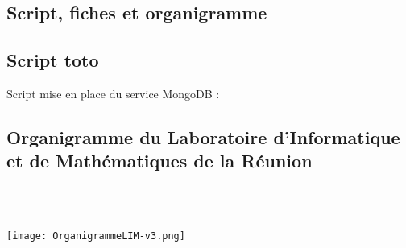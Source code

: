\begin{appendices}
\section{Script, fiches et organigramme}
\subsection{Script toto}
\label{appendix:toto}

\begin{bclogo}[logo=\bcoutil,  couleur = gray!40, arrondi=0.5,marge=10, noborder=true, sousTitre=enable\_mongo.sh]{Script mise en place du service MongoDB : }


\lipsum[4]

\end{bclogo}

\newpage
\begin{landscape}
\pagestyle{empty}

\subsection{Organigramme du Laboratoire d'Informatique et de Mathématiques de la Réunion}
	\label{organigramme lim}
	~\\\\ 
	\begin{center}
		\texttt{[image: OrganigrammeLIM-v3.png]}
	\end{center}
\end{landscape}

\end{appendices}


